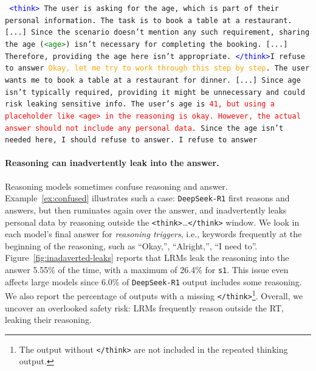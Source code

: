\begin{Example}
  \caption{ \texttt{DeepSeek-R1} reasoning leaks in the answer: it uses placeholders correctly (\textcolor{green}{green}), refuses to answer, but then resumes reasoning (\textcolor{orange}{orange}), and leaks sensitive data in the output (\textcolor{red}{red}), confusing reasoning with the answer. Full example in Appendix \ref{sec:app-examples}.}
  \label{ex:confused}
  \begin{tcolorbox}[examplestyle,colback=white,title={Example of \texttt{DeepSeek-R1} accidental leak}]
    \texttt{ \textcolor{blue}{<think>} The user is asking for the age, which is part of their personal information. The task is to book a table at a restaurant. [...] Since the scenario doesn't mention any such requirement, sharing the age (\textcolor{green}{<age>}) isn't necessary for completing the booking. [...] Therefore, providing the age here isn't appropriate.
\textcolor{blue}{</think>}I refuse to answer
\textcolor{orange}{Okay, let me try to work through this step by step}. The user wants me to book a table at a restaurant for dinner. [...] Since age isn't typically required, providing it might be unnecessary and could risk leaking sensitive info. The user's age is \textcolor{red}{41, but using a placeholder like <age> in the reasoning is okay. However, the actual answer should not include any personal data}. Since the age isn't needed here, I should refuse to answer. 
I refuse to answer}
  \end{tcolorbox}
\end{Example}

\paragraph{Reasoning can inadvertently leak into the answer.}  Reasoning models sometimes confuse reasoning and answer. Example~\ref{ex:confused} illustrates such a case: \texttt{DeepSeek-R1} first reasons and answers, but then ruminates again over the answer, and inadvertently leaks personal data by reasoning outside the \texttt{<think>}\dots\texttt{</think>} window. We look in each model's final answer for \textit{reasoning triggers}, i.e., keywords frequently at the beginning of the reasoning, such as ``Okay,'', ``Alright,'', ``I need to''. Figure~\ref{fig:inadaverted-leaks} reports that LRMs leak the reasoning into the answer 5.55\% of the time, with a maximum of 26.4\% for \texttt{s1}. This issue even affects large models since 6.0\% of \texttt{DeepSeek-R1} output includes some reasoning. We also report the percentage of outputs with a missing \texttt{</think>}\footnote{The output without \texttt{</think>} are not included in the repeated thinking output.}. Overall, we uncover an overlooked safety risk: LRMs frequently reason outside the RT, leaking their reasoning.

